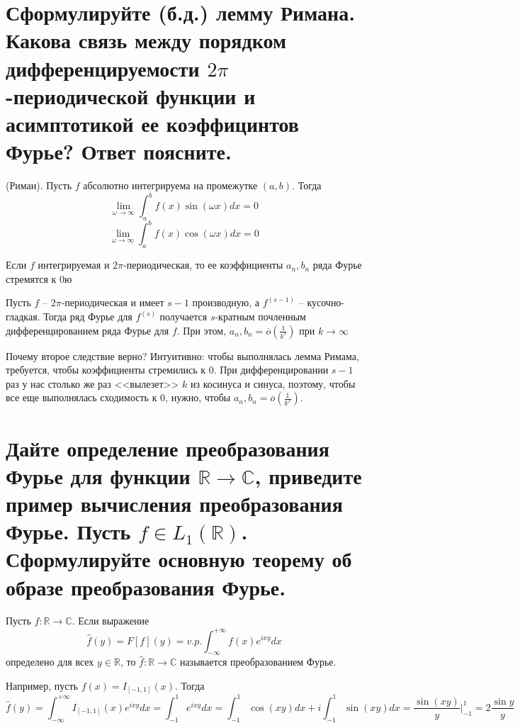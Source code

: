 \setcounter{section}{7}
\section{Сформулируйте (б.д.) лемму Римана. Какова связь между порядком дифференцируемости $2\pi$-периодической функции и асимптотикой ее коэффицинтов Фурье? Ответ поясните.}
\begin{lemma} (Риман).
    Пусть $f$ абсолютно интегрируема на промежутке $(a, b)$. Тогда
    $$
        \lim\limits_{\omega\to\infty}\int_{a}^{b}f(x)\sin(\omega x)dx = 0
    $$
    $$
        \lim\limits_{\omega\to\infty}\int_{a}^{b}f(x)\cos(\omega x)dx = 0
    $$
\end{lemma}

\begin{corollary}
    Если $f$ интегрируемая и $2\pi$-периодическая, то ее коэффициенты $a_n, b_n$ ряда Фурье стремятся к 0ю
\end{corollary}

\begin{corollary}
    Пусть $f$ -- $2\pi$-периодическая и имеет $s - 1$ производную, а $f^{(s - 1)}$ -- кусочно-гладкая. Тогда ряд Фурье для $f^{(s)}$ получается $s$-кратным почленным дифференцированием ряда Фурье для $f$. При этом, $a_n, b_n = \overline{o}\left(\frac{1}{k^s}\right)$ при $k\to\infty$
\end{corollary}
Почему второе следствие верно? Интуитивно: чтобы выполнялась лемма Римама, требуется, чтобы коэффициенты стремились к 0. При дифференцировании $s - 1$ раз у нас столько же раз <<вылезет>> $k$ из косинуса и синуса, поэтому, чтобы все еще выполнялась сходимость к 0, нужно, чтобы $a_n, b_n = \overline{o}\left(\frac{1}{k^s}\right)$.

\section{Дайте определение преобразования Фурье для функции $\mathbb{R}\to\mathbb{C}$, приведите пример вычисления преобразования Фурье. Пусть $f\in L_1(\mathbb{R})$. Сформулируйте основную теорему об образе преобразования Фурье.}
\begin{definition}
    Пусть $f\colon\mathbb{R}\to\mathbb{C}$. Если выражение $$\hat{f}(y) = F[f](y) = v.p.\int_{-\infty}^{+\infty}f(x)e^{ixy}dx$$ определено для всех $y\in\mathbb{R}$, то $\hat{f}\colon\mathbb{R}\to\mathbb{C}$ называется преобразованием Фурье.
\end{definition}

Например, пусть $f(x) = I_{[-1, 1]}(x)$. Тогда
$$
    \hat{f}(y) = \int_{-\infty}^{+\infty}I_{[-1, 1]}(x)e^{ixy}dx = \int_{-1}^{1}e^{ixy}dx = \int_{-1}^{1}\cos(xy)dx + i\int_{-1}^{1}\sin(xy)dx = \frac{\sin(xy)}{y}\Big|_{-1}^{1} = 2\frac{\sin y}{y}
$$

